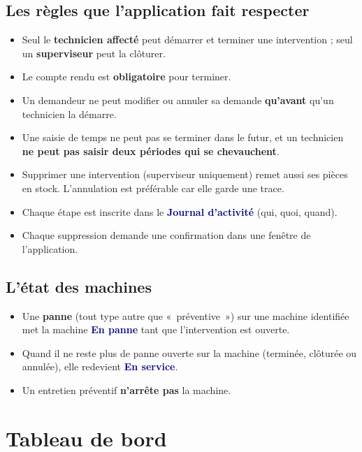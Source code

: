 \documentclass[11pt,a4paper]{article}
\newcommand{\ui}[1]{\textbf{\textcolor{navy}{#1}}}          %
\begin{document}
\subsection{Les règles que l'application fait respecter}

\begin{retenir}
\begin{itemize}
  \item Seul le \textbf{technicien affecté} peut démarrer et terminer une intervention ; seul un \textbf{superviseur} peut la clôturer.
  \item Le compte rendu est \textbf{obligatoire} pour terminer.
  \item Un demandeur ne peut modifier ou annuler sa demande \textbf{qu'avant} qu'un technicien la démarre.
  \item Une saisie de temps ne peut pas se terminer dans le futur, et un technicien \textbf{ne peut pas saisir deux périodes qui se chevauchent}.
  \item Supprimer une intervention (superviseur uniquement) remet aussi ses pièces en stock. L'annulation est préférable car elle garde une trace.
  \item Chaque étape est inscrite dans le \ui{Journal d'activité} (qui, quoi, quand).
  \item Chaque suppression demande une confirmation dans une fenêtre de l'application.
\end{itemize}
\end{retenir}

\subsection{L'état des machines}

\begin{itemize}
  \item Une \textbf{panne} (tout type autre que «~préventive~») sur une machine identifiée met la machine \ui{En panne} tant que l'intervention est ouverte.
  \item Quand il ne reste plus de panne ouverte sur la machine (terminée, clôturée ou annulée), elle redevient \ui{En service}.
  \item Un entretien préventif \textbf{n'arrête pas} la machine.
\end{itemize}

\section{Tableau de bord}
\end{document}
